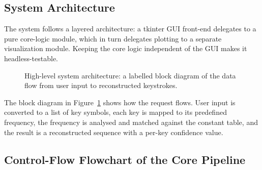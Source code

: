 \documentclass[11pt,a4paper]{article}
\begin{document}
\subsection{System Architecture}

The system follows a layered architecture: a tkinter GUI front-end delegates
to a pure core-logic module, which in turn delegates plotting to a separate
visualization module. Keeping the core logic independent of the GUI makes it
headless-testable.

\begin{figure}[H]
    \centering
    \caption{High-level system architecture: a labelled block diagram of the
             data flow from user input to reconstructed keystrokes.}
    \label{fig:arch}
\end{figure}

The block diagram in Figure~\ref{fig:arch} shows how the request flows. User
input is converted to a list of key symbols, each key is mapped to its
predefined frequency, the frequency is analysed and matched against the
constant table, and the result is a reconstructed sequence with a per-key
confidence value.

\subsection{Control-Flow Flowchart of the Core Pipeline}
\end{document}
